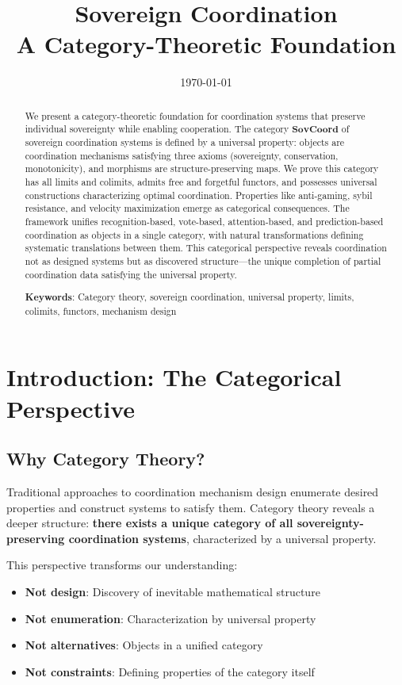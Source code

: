 \documentclass[11pt,a4paper]{article}
\title{\textbf{Sovereign Coordination}\\
\large A Category-Theoretic Foundation}
\author{}
\date{\today}
\theoremstyle{definition}
\theoremstyle{remark}
\newcommand{\SovCoord}{\mathbf{SovCoord}}
\begin{document}
\maketitle

\begin{abstract}
We present a category-theoretic foundation for coordination systems that preserve individual sovereignty while enabling cooperation. The category $\SovCoord$ of sovereign coordination systems is defined by a universal property: objects are coordination mechanisms satisfying three axioms (sovereignty, conservation, monotonicity), and morphisms are structure-preserving maps. We prove this category has all limits and colimits, admits free and forgetful functors, and possesses universal constructions characterizing optimal coordination. Properties like anti-gaming, sybil resistance, and velocity maximization emerge as categorical consequences. The framework unifies recognition-based, vote-based, attention-based, and prediction-based coordination as objects in a single category, with natural transformations defining systematic translations between them. This categorical perspective reveals coordination not as designed systems but as discovered structure—the unique completion of partial coordination data satisfying the universal property.

\medskip

\noindent\textbf{Keywords}: Category theory, sovereign coordination, universal property, limits, colimits, functors, mechanism design
\end{abstract}

\tableofcontents
\newpage

\section{Introduction: The Categorical Perspective}

\subsection{Why Category Theory?}

Traditional approaches to coordination mechanism design enumerate desired properties and construct systems to satisfy them. Category theory reveals a deeper structure: \textbf{there exists a unique category of all sovereignty-preserving coordination systems}, characterized by a universal property.

This perspective transforms our understanding:
\begin{itemize}
\item \textbf{Not design}: Discovery of inevitable mathematical structure
\item \textbf{Not enumeration}: Characterization by universal property
\item \textbf{Not alternatives}: Objects in a unified category
\item \textbf{Not constraints}: Defining properties of the category itself
\end{itemize}
\end{document}
